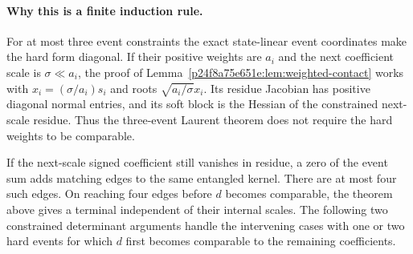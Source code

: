 \paragraph{Why this is a finite induction rule.}
For at most three event constraints the exact state-linear event coordinates make the hard form diagonal. If their positive weights are $a_i$ and the next coefficient scale is $\sigma\ll a_i$, the proof of Lemma~\ref{p24f8a75e651e:lem:weighted-contact} works with
$x_i=(\sigma/a_i)s_i$ and roots $\sqrt{a_i/\sigma}x_i$.
Its residue Jacobian has positive diagonal normal entries, and its soft block is the Hessian of the constrained next-scale residue. Thus the three-event Laurent theorem does not require the hard weights to be comparable.

If the next-scale signed coefficient still vanishes in residue, a zero of the event sum adds matching edges to the same entangled kernel. There are at most four such edges. On reaching four edges before $d$ becomes comparable, the theorem above gives a terminal independent of their internal scales. The following two constrained determinant arguments handle the intervening cases with one or two hard events for which $d$ first becomes comparable to the remaining coefficients.
